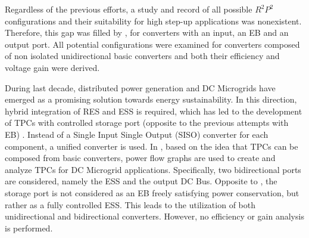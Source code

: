 \documentclass[conference]{IEEEtran}
\begin{document}
Regardless of the previous efforts, a study and record of all possible $R^2P^2$ configurations and their suitability for high step-up applications was nonexistent. Therefore, this gap was filled by \cite{zogogianni_non-isolated_2019}, for converters with an input, an EB and an output port. All potential configurations were examined for converters composed of non isolated unidirectional basic converters and both their efficiency and voltage gain were derived.

During last decade, distributed power generation and DC Microgrids have emerged as a promising solution towards energy sustainability. In this direction, hybrid integration of RES and ESS is required, which has led to the development of TPCs with controlled storage port (opposite to the previous attempts with EB) \cite{salagiannis_review_2024}. Instead of a Single Input Single Output (SISO) converter for each component, a unified converter is used.  In \cite{aljarajreh_synthesis_2021}, based on the idea that TPCs can be composed from basic converters, power flow graphs are used to create and analyze TPCs for DC Microgrid applications. Specifically, two bidirectional ports are considered, namely the ESS and the output DC Bus. Opposite to \cite{zogogianni_non-isolated_2019}, the storage port is not considered as an EB freely satisfying power conservation, but rather as a fully controlled ESS. This leads to the utilization of both unidirectional and bidirectional converters. However, no efficiency or gain analysis is performed.
\end{document}
